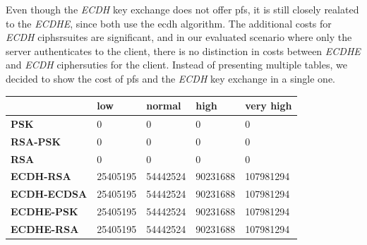 \documentclass{llncs}
\begin{document}
Even though the \textit{ECDH} key exchange does not offer \gls{pfs}, it is still closely realated to the \textit{ECDHE}, since both use
the \gls{ecdh} algorithm. The additional costs for \textit{ECDH} ciphsrsuites are significant, and in our evaluated scenario where only the server
authenticates to the client, there is no distinction in costs between \textit{ECDHE} and \textit{ECDH} ciphersuties for the client. Instead of 
presenting multiple tables, we decided to show the cost of \gls{pfs} and the \textit{ECDH} key exchange in a single one.

\begin{table}[]
\begin{tabular}{|l|l|l|l|l|}
\hline
                                           & \textbf{low}                    & \textbf{normal}                 & \textbf{high}                   & \textbf{very high}               \\ \hline
\textbf{PSK}                               & 0                               & 0                               & 0                               & 0                                \\ \hline
\textbf{RSA-PSK}                           & 0                               & 0                               & 0                               & 0                                \\ \hline
\textbf{RSA}                               & 0                               & 0                               & 0                               & 0                                \\ \hline
\rowcolor[HTML]{9B9B9B} 
{\color[HTML]{333333} \textbf{ECDH-RSA}}   & {\color[HTML]{333333} 25405195} & {\color[HTML]{333333} 54442524} & {\color[HTML]{333333} 90231688} & {\color[HTML]{333333} 107981294} \\ \hline
\rowcolor[HTML]{9B9B9B} 
{\color[HTML]{333333} \textbf{ECDH-ECDSA}} & {\color[HTML]{333333} 25405195} & {\color[HTML]{333333} 54442524} & {\color[HTML]{333333} 90231688} & {\color[HTML]{333333} 107981294} \\ \hline
\textbf{ECDHE-PSK}                         & 25405195                        & 54442524                        & 90231688                        & 107981294                        \\ \hline
\textbf{ECDHE-RSA}                         & 25405195                        & 54442524                        & 90231688                        & 107981294                        \\ \hline

\end{tabular}
\end{table}
\end{document}
